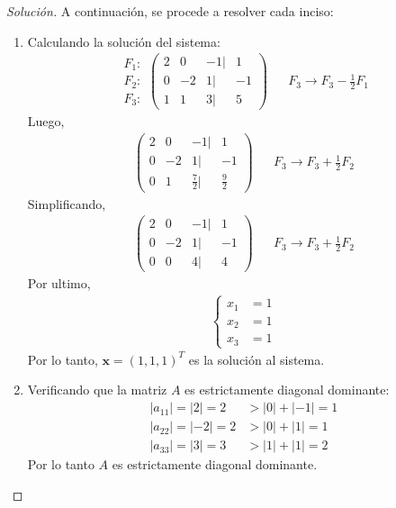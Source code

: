 \documentclass[12pt]{book}
\newcommand\abs[1]{\left\lvert#1\right\rvert}
\newenvironment{solucion}
  {\renewcommand\qedsymbol{$\square$}\begin{proof}[Solución]}
  {\end{proof}}
\begin{document}
 \begin{solucion}
 A continuación, se procede a resolver cada inciso:
 \begin{enumerate}
    \item Calculando la solución del sistema:
    \begin{align*}
        \begin{matrix}
            F_1 :\\
            F_2: \\
            F_3:
        \end{matrix} \begin{pmatrix}
            2 & 0 & -1 |& 1 \\
            0 & -2 & 1 |& -1 \\
            1 & 1 & 3  |& 5 
        \end{pmatrix}& & F_3 \rightarrow F_3 - \frac{1}{2} F_1 
    \end{align*}
    Luego,
    \begin{align*}
        \begin{pmatrix}
            2 & 0 & -1 |& 1 \\
            0 & -2 & 1 |& -1\\
            0 & 1 & \frac{7}{2} |& \frac{9}{2}
        \end{pmatrix}  & & F_3 \rightarrow F_3 + \frac{1}{2} F_2 
    \end{align*}
    Simplificando,
    \begin{align*}
        \begin{pmatrix}
            2 & 0 & -1 |& 1 \\
            0 & -2 & 1 |& -1 \\
            0 & 0 & 4 |& 4
        \end{pmatrix} & & F_3 \rightarrow F_3 + \frac{1}{2} F_2 
    \end{align*}
    Por ultimo,
    \begin{align*}
        \begin{cases}
            x_1&=1\\
            x_2&=1\\
            x_3&=1
        \end{cases}
    \end{align*}
    Por lo tanto, $\bm{x}=(1,1,1)^T$ es la solución al sistema.
    \item Verificando que la matriz $A$ es estrictamente diagonal dominante:
    \begin{align*}
        \abs{a_{11}} = \abs{2 } = 2 &> \abs{0 } + \abs{-1 } = 1\\
        \abs{a_{22}} = \abs{-2 } = 2 &> \abs{0 } + \abs{1 } = 1 \\
        \abs{a_{33}} = \abs{3 } =3 &> \abs{1 } + \abs{1 } = 2
    \end{align*}
    Por lo tanto $A$ es estrictamente diagonal dominante.
\end{enumerate}


 \end{solucion}
\end{document}
